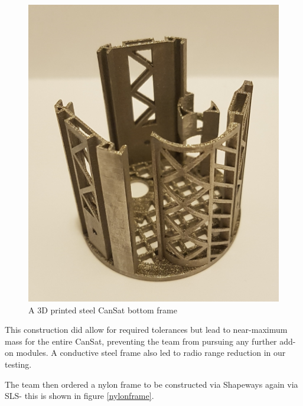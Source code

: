 \documentclass[]{report}
\begin{document}
\begin{figure}[h]
	\hfill\includegraphics[scale=0.15]{steel_frame.jpg}\hspace*{\fill}
	\caption{A 3D printed steel CanSat bottom frame}
	\label{steelframe}
\end{figure}

This construction did allow for required tolerances but lead to near-maximum mass for the entire CanSat, preventing the team from pursuing any further add-on modules. A conductive steel frame also led to radio range reduction in our testing.

The team then ordered a nylon frame to be constructed via Shapeways again via SLS- this is shown in figure \ref{nylonframe}.
\end{document}
